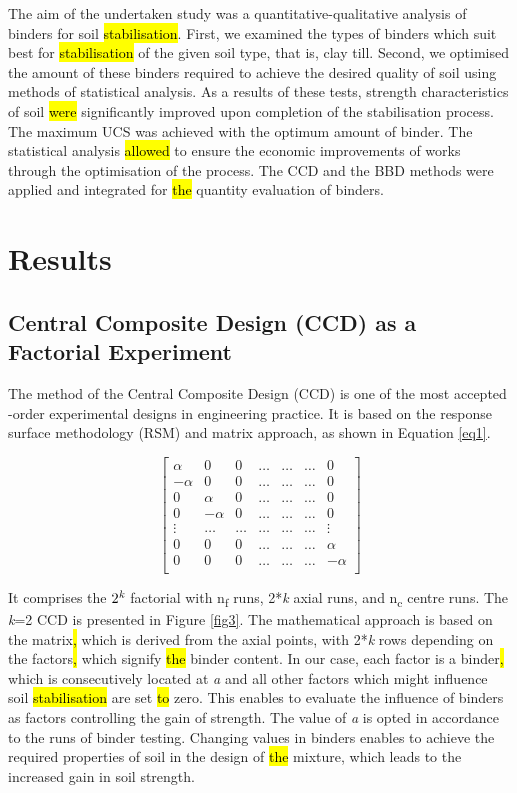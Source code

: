 \documentclass[eprint,
]{actapoly}
\begin{document}
The aim of the undertaken study was a quantitative-qualitative analysis of binders for soil \hl{stabilisation}. First, we examined the types of binders which suit best for \hl{stabilisation} of the given soil type, that is, clay till. Second, we optimised the amount of these binders required to achieve the desired quality of soil using methods of statistical analysis. As a results of these tests, strength characteristics of soil \hl{were} significantly improved upon completion of the stabilisation process. The maximum UCS was achieved with the optimum amount of binder. The statistical analysis \hl{allowed} to ensure the economic improvements of works through the optimisation of the process. The CCD and the BBD methods were applied and integrated for \hl{the} quantity evaluation of binders.

\section{Results}
\subsection{Central Composite Design (CCD) as a Factorial Experiment}
The method of the Central Composite Design (CCD) is one of the most accepted -order experimental designs in engineering practice. It is based on the response surface methodology (RSM) \cite{Montgomery2019} and matrix approach, as shown in Equation \ref{eq1}. 

\begin{equation}\label{eq1}
\begin{bmatrix}
\alpha & 0 & 0 & \ldots & \ldots & \ldots & 0 \\
-\alpha & 0 & 0 & \ldots & \ldots & \ldots & 0 \\
0 & \alpha & 0 & \ldots & \ldots & \ldots & 0 \\
0 & -\alpha & 0 & \ldots & \ldots & \ldots & 0 \\
\vdots & \ldots & \ldots & \ldots & \ldots & \ldots & \vdots \\
0 & 0 & 0 & \ldots & \ldots & \ldots & \alpha \\
0 & 0 & 0 & \ldots & \ldots & \ldots & -\alpha \\
\end{bmatrix}
\end{equation}

It comprises the $2^\emph{k}$ factorial with n\textsubscript{f} runs, 2*\emph{k} axial runs, and n\textsubscript{c} centre runs. The \emph{k}=2 CCD is presented in Figure \ref{fig3}. The mathematical approach is based on the matrix\hl{, }which is derived from the axial points, with 2*\emph{k} rows depending on the factors\hl{, }which signify \hl{the} binder content. In our case, each factor is a binder\hl{, }which is consecutively located at \emph{a} and all other factors which might influence soil \hl{stabilisation} are set \hl{to} zero. This enables to evaluate the influence of binders as factors controlling the gain of strength. The value of \emph{a} is opted in accordance to the runs of binder testing. Changing values in binders enables to achieve the required properties of soil in the design of \hl{the} mixture, which leads to the increased gain in soil strength.
\end{document}
